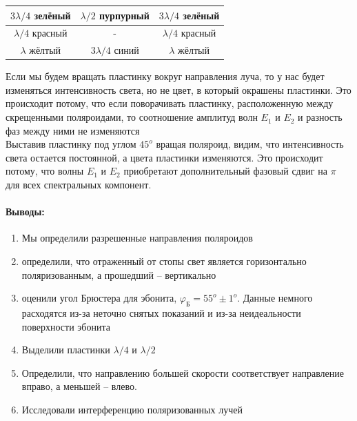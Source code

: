 \documentclass[a4paper,12pt]{article}
\begin{document}
\begin{enumerate}
\begin{center}
\begin{tabular}{ |c|c|c|}
		        \hline
		        $3\lambda/4$ зелёный & $\lambda/2$ пурпурный & $3\lambda/4$ зелёный\\
		        \hline
		        $\lambda/4$ красный & - & $\lambda/4$ красный \\
		        \hline
		        $\lambda$ жёлтый & $3\lambda/4$ синий & $\lambda$ жёлтый \\
		        \hline
		        \end{tabular}
\end{center}
Если мы будем вращать пластинку вокруг направления луча, то у нас будет изменяться интенсивность света, но не цвет, в который окрашены пластинки. Это происходит потому, что если поворачивать пластинку, расположенную между
скрещенными поляроидами, то соотношение
амплитуд волн $E_1$ и $E_2$ и разность фаз между ними не изменяются\\
Выставив пластинку под углом $45^o$ вращая поляроид, видим, что интенсивность света остается постоянной, а цвета пластинки изменяются. Это происходит потому, что волны $E_1$ и $E_2$ приобретают дополнительный фазовый сдвиг на $\pi$ для всех спектральных компонент.\\
\end{enumerate}
\paragraph{Выводы:}
\begin{enumerate}
\item Мы определили разрешенные направления поляроидов
\item определили, что отраженный от стопы свет является горизонтально поляризованным, а прошедший -- вертикально
\item оценили угол Брюстера для эбонита, $\varphi_{\text{Б}}=55^o\pm 1^o$. Данные немного расходятся из-за неточно снятых показаний и из-за неидеальности поверхности эбонита
\item Выделили пластинки $\lambda/4$ и $\lambda/2$
\item Определили, что направлению большей скорости соответствует направление вправо, а меньшей -- влево.
\item Исследовали интерференцию поляризованных лучей 
\end{enumerate}
\end{document}

